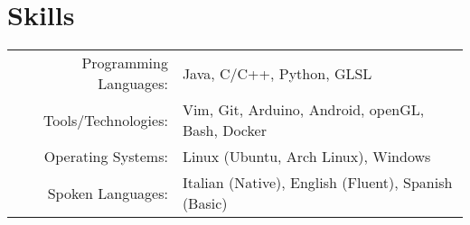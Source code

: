 \documentclass[a4paper,10pt]{article} %
\begin{document}
\section{Skills}
\begin{tabular}{rl}
Programming Languages: & Java, C/C++, Python, GLSL \\
Tools/Technologies: & Vim, Git, Arduino, Android, openGL, Bash, Docker\\
Operating Systems: & Linux (Ubuntu, Arch Linux), Windows\\
Spoken Languages: & Italian (Native), English (Fluent), Spanish (Basic)\\
\end{tabular}

\bigskip

\end{document}
